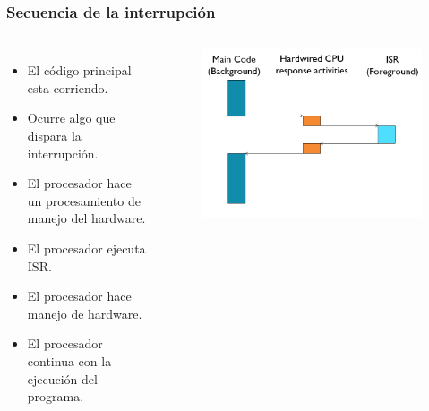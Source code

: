 \documentclass[10.5pt,scale=1.0,t,aspectratio=169,hyperref={pdfpagelabels=false}]{beamer}
\begin{document}
\begin{frame}
	\frametitle{Secuencia de la interrupción}
	\begin{columns}
		\begin{itemize}
			\item El código principal esta corriendo.
			\item Ocurre algo que dispara la interrupción.
			\item El procesador hace un procesamiento de manejo del hardware.
			\item El procesador ejecuta ISR.
			\item El procesador hace manejo de hardware.
			\item El procesador continua con la ejecución del programa. 
		\end{itemize}
	
		\begin{figure}
			\centering
			\includegraphics[scale=0.4]{02_EjecucionInterrupcion}
		\end{figure}
	\end{columns}
\end{frame}
\end{document}
